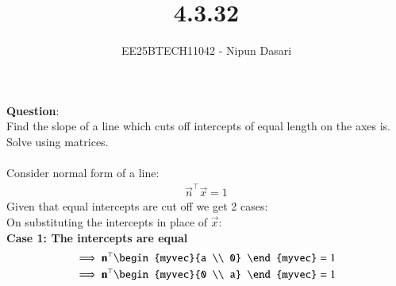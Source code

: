 \documentclass[journal]{IEEEtran}
\begin{document}
	
	
	\vspace{3cm}
	
	\title{4.3.32}
	\author{EE25BTECH11042 - Nipun Dasari}
	\maketitle
		
	\renewcommand{\thefigure}{\theenumi}
	\renewcommand{\thetable}{\theenumi}
	\setlength{\intextsep}{10pt} %
	
	
	\renewcommand{\thetable}{\theenumi}
	
	\textbf{Question}:\\
	Find the slope of a line which cuts off intercepts of equal length on the axes is. Solve using matrices. \\ 
	\solution \\
	Consider normal form of a line:
	\begin{align}
		\vec{n}^\top\vec{x} = 1
	\end{align}
	Given that equal intercepts are cut off we get 2 cases:\\
	On substituting the intercepts in place of $\vec{x}$: \\
	\textbf{Case 1: The intercepts are equal }
	\begin{align}
		\implies  \vec{n}^\top\begin{myvec}{a \\ 0} \end{myvec} = 1 \label{0.2}\\
		\implies \vec{n}^\top\begin{myvec}{0 \\ a} \end{myvec} = 1 \label{0.3} \\
	\end{align}
	
\end{document}
